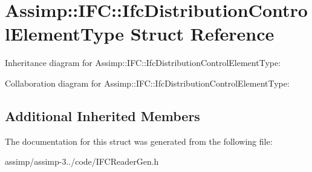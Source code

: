 \hypertarget{struct_assimp_1_1_i_f_c_1_1_ifc_distribution_control_element_type}{\section{Assimp\+:\+:I\+F\+C\+:\+:Ifc\+Distribution\+Control\+Element\+Type Struct Reference}
\label{struct_assimp_1_1_i_f_c_1_1_ifc_distribution_control_element_type}
}


Inheritance diagram for Assimp\+:\+:I\+F\+C\+:\+:Ifc\+Distribution\+Control\+Element\+Type\+:


Collaboration diagram for Assimp\+:\+:I\+F\+C\+:\+:Ifc\+Distribution\+Control\+Element\+Type\+:
\subsection*{Additional Inherited Members}


The documentation for this struct was generated from the following file\+:\begin{DoxyCompactItemize}
\item 
assimp/assimp-\/3../code/I\+F\+C\+Reader\+Gen.\+h\end{DoxyCompactItemize}
